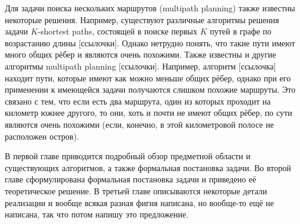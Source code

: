 Для задачи поиска нескольких маршрутов (multipath planning) также
известны некоторые решения. Например, существуют различные алгоритмы
решения задачи $K$-shortest paths, состоящей в поиске первых $K$ путей
в графе по возрастанию длины [ссылочки]. Однако нетрудно понять, что
такие пути имеют много общих рёбер и являются очень похожими. Также
известны и другие алгоритмы multipath planning [ссылочки]. Например,
алгоритм [ссылочка] находит пути, которые имеют как можно меньше общих
рёбер, однако при его применении к имеющейся задачи получаются слишком
похожие маршруты. Это связано с тем, что если есть два маршрута, один
из которых проходит на километр южнее другого, то они, хоть и почти не
имеют общих рёбер, по сути являются очень похожими (если, конечно, в
этой километровой полосе не расположен остров).

В первой главе приводится подробный обзор предметной области и
существующих алгоритмов, а также формальная постановка задачи. Во второй главе сформулирована формальная
постановка задачи и приведено её теоретическое решение. В третьей
главе описываются некоторые детали реализации и вообще всякая разная
фигня написана, но вообще-то ещё не написана, так что потом напишу это
предложение.

\FloatBarrier


